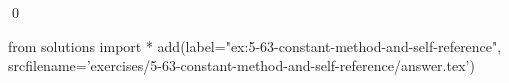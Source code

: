 
\begin{ex}
  \label{ex:5-63-constant-method-and-self-reference}
  
  \qed
\end{ex}
\begin{python0}
from solutions import *
add(label="ex:5-63-constant-method-and-self-reference",
    srcfilename='exercises/5-63-constant-method-and-self-reference/answer.tex')
\end{python0}
